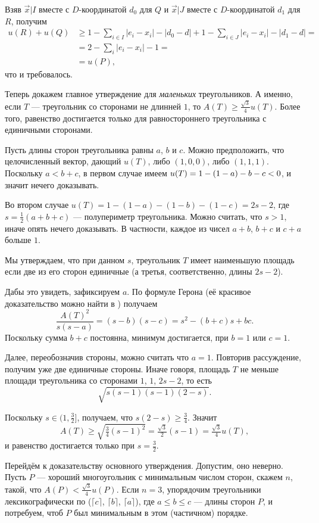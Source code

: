 Взяв $\vec x|I$ вместе с $D$-координатой $d_0$ для $Q$ и 
$\vec x|J$ вместе с $D$-координатой $d_1$ для $R$, получим
\begin{align*}
u(R)+u(Q)
&\geqslant
1-\sum_{i\in I}|e_i-x_i|-|d_0-d|
+
1-\sum_{i\in J}|e_i-x_i|-|d_1-d|
=
\\
&=
2-\sum_{i}|e_i-x_i|-1=
\\
&=u(P),
\end{align*}
что и требовалось.

Теперь докажем главное утверждение для \emph{маленьких} треугольников.
А именно, если $T$ --- треугольник со сторонами не длинней $1$, то 
$A(T)\geqslant \tfrac{\sqrt{3}}{4}u(T)$.
Более того, равенство достигается только для равностороннего треугольника с единичными сторонами.

Пусть длины сторон треугольника равны $a$, $b$ и $c$.
Можно предположить, что целочисленный вектор, дающий $u(T)$, либо $(1, 0, 0)$, либо $(1, 1, 1)$.
Поскольку $a < b + c$, в первом случае имеем $u(T)\z=1-(1-a)-b-c<0$, и значит нечего доказывать.

Во втором случае
$u(T)=1-(1-a)-(1-b)-(1-c)=2s-2$, где $s=\tfrac12(a+b+c)$ --- полупериметр треугольника.
Можно считать, что $s > 1$, иначе опять нечего доказывать.
В частности, каждое из чисел $a+b$, $b+c$ и $c+a$ больше $1$.

Мы утверждаем, что при данном $s$, треугольник $T$ имеет наименьшую площадь если две из его сторон единичные (а третья, соответственно, длины $2s - 2$).

Дабы это увидеть, зафиксируем $a$. 
По формуле Герона (её красивое доказательство можно найти в \cite{39}) получаем
\[\frac{A(T)^2}{s(s-a)}=(s-b)(s-c)=s^2-(b+c)s+bc.\]
Поскольку сумма $b + c$ постоянна, минимум достигается, при $b = 1$ или $c = 1$.

Далее, переобозначив стороны, можно считать что $a = 1$.
Повторив рассуждение, получим уже две единичные стороны.
Иначе говоря, площадь $T$ не меньше площади треугольника со сторонами $1$, $1$, $2s - 2$, то есть \[\sqrt{s(s-1)(s-1)(2-s)}.\]

Поскольку $s\in(1,\tfrac32]$, получаем, что $s(2-s)\geqslant \tfrac34$.
Значит 
\[A(T)\ge \sqrt{\tfrac34(s-1)^2}=\tfrac{\sqrt{3}}2(s-1)=\tfrac{\sqrt{3}}4u(T),\]
и равенство достигается только при $s=\tfrac32$.

Перейдём к доказательству основного утверждения.
Допустим, оно неверно.
Пусть $P$ --- хороший многоугольник с минимальным числом сторон, скажем $n$, такой, что $A(P)<\tfrac{\sqrt{3}}4 u(P)$.
Если $n=3$, упорядочим треугольники лексикографически по ($\lceil c\rceil$, $\lceil b\rceil$, $\lceil a\rceil$), где 
$a\leqslant b\leqslant c$ --- длины сторон $P$, и потребуем, чтоб $P$ был минимальным в этом (частичном) порядке.


